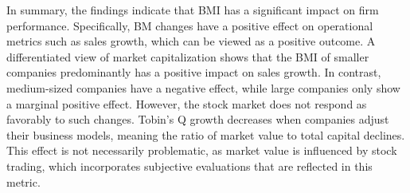 \documentclass[
]{article}
\begin{document}
In summary, the findings indicate that BMI has a significant impact on
firm performance. Specifically, BM changes have a positive effect on
operational metrics such as sales growth, which can be viewed as a
positive outcome. A differentiated view of market capitalization shows
that the BMI of smaller companies predominantly has a positive impact on
sales growth. In contrast, medium-sized companies have a negative
effect, while large companies only show a marginal positive effect.
However, the stock market does not respond as favorably to such changes.
Tobin's Q growth decreases when companies adjust their business models,
meaning the ratio of market value to total capital declines. This effect
is not necessarily problematic, as market value is influenced by stock
trading, which incorporates subjective evaluations that are reflected in
this metric.

\begin{table}[H]
\centering\centering
\caption{Regression Results I}
\centering
{}
\end{table}
\end{document}
